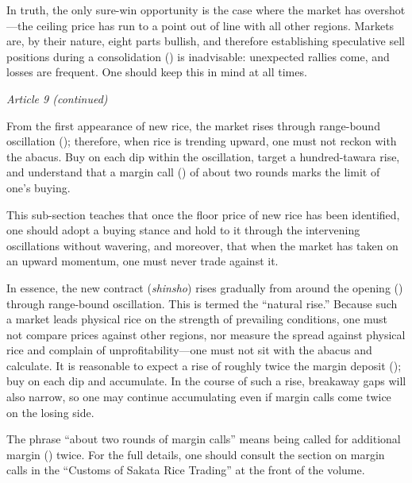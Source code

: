 In truth, the only sure-win opportunity is the case where the market has
overshot---the ceiling price has run to a point out of line with all
other regions. Markets are, by their nature, eight parts bullish, and
therefore establishing speculative sell positions during a consolidation
() is inadvisable: unexpected rallies come,
and losses are frequent. One should keep this in mind at all times.

\begin{sokyubox}
{\small\itshape\color{sokyubar} Article 9 (continued)}

\medskip
From the first appearance of new rice, the market rises through
range-bound oscillation (); therefore, when
rice is trending upward, one must not reckon with the abacus. Buy on
each dip within the oscillation, target a hundred-tawara rise, and
understand that a margin call () of about two rounds
marks the limit of one's buying.
\end{sokyubox}

\commentary
This sub-section teaches that once the floor price of new rice has been
identified, one should adopt a buying stance and hold to it through the
intervening oscillations without wavering, and moreover, that when the
market has taken on an upward momentum, one must never trade against it.

In essence, the new contract (\textit{shinsho}) rises gradually from
around the opening () through range-bound oscillation.
This is termed the ``natural rise.'' Because such a market leads physical
rice on the strength of prevailing conditions, one must not compare
prices against other regions, nor measure the spread against physical
rice and complain of unprofitability---one must not sit with the abacus
and calculate. It is reasonable to expect a rise of roughly twice the
margin deposit (); buy on each dip and
accumulate. In the course of such a rise, breakaway gaps will also
narrow, so one may continue accumulating even if margin calls come twice
on the losing side.

The phrase ``about two rounds of margin calls'' means being called for
additional margin () twice. For the full
details, one should consult the section on margin calls in the ``Customs
of Sakata Rice Trading'' at the front of the volume.

